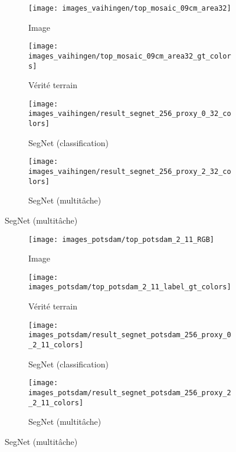 \begin{figure}[ht]
  \captionsetup{justification=centering,width=0.9\textwidth}
  \begin{subfigure}[t]{0.24\textwidth}
  	\texttt{[image: images\_vaihingen/top\_mosaic\_09cm\_area32]}
      \caption*{Image }
  \end{subfigure}
  \begin{subfigure}[t]{0.24\textwidth}
  	\texttt{[image: images\_vaihingen/top\_mosaic\_09cm\_area32\_gt\_colors]}
      \caption*{Vérité terrain}
  \end{subfigure}
  \begin{subfigure}[t]{0.24\textwidth}
  	\texttt{[image: images\_vaihingen/result\_segnet\_256\_proxy\_0\_32\_colors]}
      \caption*{SegNet (classification)}
  \end{subfigure}
  \begin{subfigure}[t]{0.24\textwidth}
  	\texttt{[image: images\_vaihingen/result\_segnet\_256\_proxy\_2\_32\_colors]}
      \caption*{SegNet (multitâche)}
  \end{subfigure}
\captionsetup{justification=justified,width=\textwidth}
\label{fig:isprs_vaihingen}
\end{figure}

\begin{figure}[ht]
  \captionsetup{justification=centering,width=0.9\textwidth}
  \begin{subfigure}[t]{0.24\textwidth}
  	\texttt{[image: images\_potsdam/top\_potsdam\_2\_11\_RGB]}
      \caption*{Image }
  \end{subfigure}
  \hfill
  \begin{subfigure}[t]{0.24\textwidth}
  	\texttt{[image: images\_potsdam/top\_potsdam\_2\_11\_label\_gt\_colors]}
      \caption*{Vérité terrain}
  \end{subfigure}
  \hfill
  \begin{subfigure}[t]{0.24\textwidth}
  	\texttt{[image: images\_potsdam/result\_segnet\_potsdam\_256\_proxy\_0\_2\_11\_colors]}
      \caption*{SegNet (classification)}
  \end{subfigure}
  \hfill
  \begin{subfigure}[t]{0.24\textwidth}
  	\texttt{[image: images\_potsdam/result\_segnet\_potsdam\_256\_proxy\_2\_2\_11\_colors]}
      \caption*{SegNet (multitâche)}
  \end{subfigure}
\captionsetup{justification=justified,width=\textwidth}
\label{fig:isprs_potsdam}
\end{figure}

